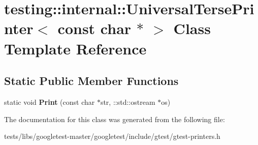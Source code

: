 \hypertarget{classtesting_1_1internal_1_1UniversalTersePrinter_3_01const_01char_01_5_01_4}{}\section{testing\+:\+:internal\+:\+:Universal\+Terse\+Printer$<$ const char $\ast$ $>$ Class Template Reference}
\label{classtesting_1_1internal_1_1UniversalTersePrinter_3_01const_01char_01_5_01_4}
\subsection*{Static Public Member Functions}
\begin{DoxyCompactItemize}
\item 
\mbox{\label{classtesting_1_1internal_1_1UniversalTersePrinter_3_01const_01char_01_5_01_4_a37a3be2d26dc07b24d16c2b5eb88ecda}} 
static void {\bfseries Print} (const char $\ast$str, \+::std\+::ostream $\ast$os)
\end{DoxyCompactItemize}


The documentation for this class was generated from the following file\+:\begin{DoxyCompactItemize}
\item 
tests/libs/googletest-\/master/googletest/include/gtest/gtest-\/printers.\+h\end{DoxyCompactItemize}
